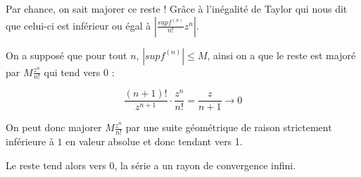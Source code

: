 \documentclass[]{article}
\begin{document}
\begin{enumerate}
Par chance, on sait majorer ce reste ! Grâce à l'inégalité de Taylor qui nous dit que celui-ci est inférieur ou égal à $\left|\frac{sup f^{(n)}}{n!}z^n\right|$.

On a supposé que pour tout $n$, $|sup f^{(n)}| \leqslant M$, ainsi on a que le reste est majoré par $M\frac{z^n}{n!}$ qui tend vers $0$ :

$$\frac{(n+1)!}{z^{n+1}} \cdot \frac{z^n}{n!} = \frac{z}{n+1} \to 0$$

On  peut donc majorer $M \frac{z^n}{n!}$ par une suite géométrique de raison strictement inférieure à $1$ en valeur absolue et donc tendant vers 1.

Le reste tend alors vers 0, la série a un rayon de convergence infini.

\end{enumerate}

\newpage

\tableofcontents
\end{document}

